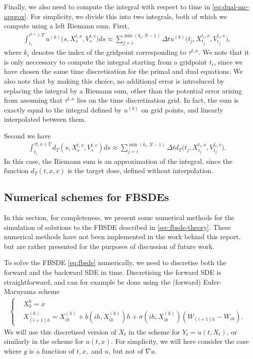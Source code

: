 Finally, we also need to compute the integral with respect to time in \autoref{eq:dual-mc-approx}. For simplicity, we divide this into two integrals, both of which we compute using a left Riemann sum. First,
%
\begin{align}
    \int_{t_i}^{\tau^{t,x}\wedge T} u^{(k)}\big(s,X_s^{t,x},V_s^{t,v}\big) ds \approx \sum_{j=i}^{\min{(k_i,N-1)}} \Delta t u^{(k)}\big(t_j,X_{t_j}^{t_i,x},V_{t_j}^{t_i,x}\big),
\end{align}
% 
where $k_i$ denotes the index of the gridpoint corresponding to $\tau^{t,x}$. We note that it is only neccessary to compute the integral starting from a gridpoint $t_i$, since we have chosen the same time discretisation for the primal and dual equations. We also note that by making this choice, no additional error is introduced by replacing the integral by a Riemann sum, other than the potential error arising from assuming that $\tau^{t,x}$ lies on the time discretisation grid. In fact, the sum is exactly equal to the integral defined by $u^{(k)}$ on grid points, and linearly interpolated between them. 

Second we have
%
\begin{align}
    \int_{t_i}^{\tau{t,x}\wedge T} d_T(s,X_s^{t,x},V_s^{t,v}) ds \approx \sum_{j=i}^{\min{(k_i,N-1)}} \Delta t d_T\big(t_j,X_{t_j}^{t_i,x},V_{t_j}^{t_i,v}\big).
\end{align}
%
In this case, the Riemann sum is an approximation of the integral, since the function $d_T(t,x,v)$ is the target dose, defined without interpolation.

%

\subsection{Numerical schemes for FBSDEs}\label{sec:fbsde-numerics}
In this section, for completeness, we present some numerical methods for the simulation of solutions to the FBSDE described in \autoref{sec:fbsde-theory}. These numerical methods have not been implemented in the work behind this report, but are rather presented for the purposes of discussion of future work.

To solve the FBSDE \autoref{eq:fbsde} numerically, we need to discretise both the forward and the backward SDE in time. Discretising the forward SDE is straightforward, and can for example be done using the (forward) Euler-Maruyama scheme
%
\begin{align} 
    \begin{cases}
    &X_0^{h} = x\\
    &X_{(i+1)h}^{(h)} = X_{ih}^{(h)} + b(ih,X_{ih}^{(h)}) h + \sigma(ih,X_{ih}^{(h)})(W_{(i+1)h}-W_{ih}).
    \end{cases}
\end{align}
%
We will use this discretised version of $X_t$ in the scheme for $Y_t=u(t,X_t)$, or similarly in the scheme for $u(t,x)$. For simplicity, we will here consider the case where $g$ is a function of $t,x,$ and $u$, but not of $\nabla u$.

